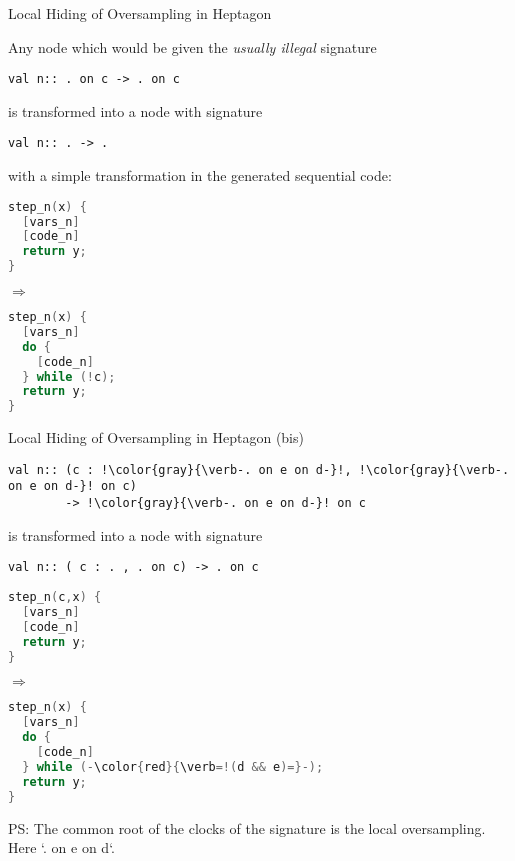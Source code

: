 \documentclass[xcolor=dvipsnames]{beamer}
\begin{document}
\begin{frame}[fragile]{Local Hiding of Oversampling in Heptagon}
\begin{block}{}
Any node which would be given the \emph{usually illegal} signature
\begin{lstlisting}
val n:: . on c -> . on c
\end{lstlisting}
is transformed into a node with signature
\begin{lstlisting}
val n:: . -> .
\end{lstlisting}
with a simple transformation in the generated sequential code:
\end{block}
\begin{block}{}
\begin{minipage}{0.4\linewidth}
\begin{lstlisting}[language=C]
step_n(x) {
  [vars_n]
  [code_n]
  return y;
}
\end{lstlisting}
\end{minipage}$\Longrightarrow$\qquad
\begin{minipage}{0.4\linewidth}
\begin{lstlisting}[language=C]
step_n(x) {
  [vars_n]
  do {
    [code_n]
  } while (!c);
  return y;
}
\end{lstlisting}
\end{minipage}
\end{block}
\end{frame}

\begin{frame}[fragile]{Local Hiding of Oversampling in Heptagon (bis)}
\begin{block}{}
\begin{lstlisting}[escapechar=!]
val n:: (c : !\color{gray}{\verb-. on e on d-}!, !\color{gray}{\verb-. on e on d-}! on c)
        -> !\color{gray}{\verb-. on e on d-}! on c
\end{lstlisting}
is transformed into a node with signature
\begin{lstlisting}
val n:: ( c : . , . on c) -> . on c
\end{lstlisting}
\end{block}
\begin{block}{}
\begin{minipage}{0.4\linewidth}
\begin{lstlisting}[language=C]
step_n(c,x) {
  [vars_n]
  [code_n]
  return y;
}
\end{lstlisting}
\end{minipage}$\Longrightarrow$\qquad
\begin{minipage}{0.4\linewidth}
\begin{lstlisting}[language=C,escapechar=-]
step_n(x) {
  [vars_n]
  do {
    [code_n]
  } while (-\color{red}{\verb=!(d && e)=}-);
  return y;
}
\end{lstlisting}
\end{minipage}
\end{block}
PS: The common root of the clocks of the signature is the local oversampling.
Here `. on e on d`. 
\end{frame}
\end{document}
